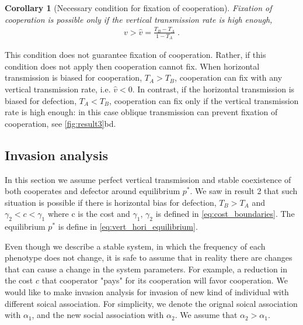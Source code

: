 \documentclass[12pt]{extarticle}
\newtheorem{corollary}{Corollary}
\begin{document}
{\begin{corollary}[Necessary condition for fixation of cooperation]
\label{corollary:vhat}
  Fixation of cooperation is possible only if the vertical transmission rate is high enough,
  \begin{equation} \label{eq:fixation_of_cooperation_vertical_transmission_condition}
    \begin{aligned}
      v>\hat{v} = \frac{T_B - T_A}{1-T_A} \;.
    \end{aligned}
    \end{equation} 
\end{corollary}
This condition does not guarantee fixation of cooperation. Rather, if this condition does not apply then cooperation cannot fix.
When horizontal transmission is biased for cooperation, $T_A>T_B$, cooperation can fix with any vertical transmission rate, i.e. $\hat{v}<0$.
In contrast, if the horizontal transmission is biased for defection, $T_A<T_B$,  cooperation can fix only if the vertical transmission rate is high enough: in this case oblique transmission can prevent fixation of cooperation, see \autoref{fig:result3}bd.
\\

\subsection*{Invasion analysis} 

In this section we assume perfect vertical transmission and stable coexistence of both cooperates and defector around equilibrium $p^*$.
We saw in result 2 that such situation is possible if there is horizontal bias for defection, $T_B > T_A$ and $\gamma_2 < c < \gamma_1$ 
where c is the cost and $\gamma_1$, $\gamma_2$ is defined in \autoref{eq:cost_boundaries}. The equilibrium $p^*$ is define in \autoref{eq:vert_hori_equilibrium}.

Even though we describe a stable system, in which the frequency of each phenotype does not change, 
it is safe to assume that in reality there are changes that can cause a change in the system parameters. 
For example, a reduction in the cost $c$ that cooperator "pays" for its cooperation will favor cooperation. 
We would like to make invasion analysis for invasion of new kind of individual with different soical association.
For simplicity, we denote the orignal soical association with $\alpha_1$, and the new social association with $\alpha_2$. 
We assume that $\alpha_2 > \alpha_1$. 

}
\end{document}
